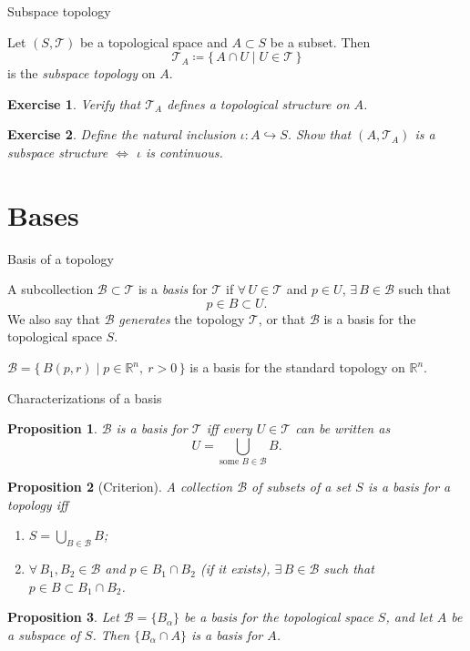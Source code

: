 \documentclass[10pt]{beamer}
\newtheorem{proposition}{Proposition}
\newtheorem{exercise}{Exercise}
\newcommand{\R}{\mathbb{R}}
\newcommand{\T}{\mathcal{T}}
\newcommand{\B}{\mathcal{B}}
\begin{document}
\begin{frame}{Subspace topology}
	\begin{definition}
		Let $(S,\T)$ be a topological space and $A \subset S$ be a subset. Then
		\[
			\T_A \coloneqq \{\, A \cap U \mid U \in \T \,\}
		\]
		is the \emph{subspace topology} on $A$.
	\end{definition}
	\begin{exercise}
		Verify that $\T_A$ defines a topological structure on $A$.
	\end{exercise}
	\begin{exercise}
		Define the natural inclusion $\iota: A \hookrightarrow S$. Show that
		$(A,\T_A)$ is a subspace structure $\iff$ $\iota$ is continuous.
	\end{exercise}
\end{frame}

\section{Bases}

\begin{frame}{Basis of a topology}
	\begin{definition}
		A subcollection $\B \subset \T$ is a \emph{basis} for $\T$ if
		$\forall\, U \in \T$ and $p \in U$, $\exists\, B \in \B$ such that
		\[
			p \in B \subset U.
		\]
		We also say that $\B$ \emph{generates} the topology $\T$, or that $\B$ is
		a basis for the topological space $S$.
	\end{definition}
	\begin{example}
		$\B = \{\, B(p,r) \mid p \in \R^n,\ r > 0 \,\}$ is a basis for the
		standard topology on $\R^n$.
	\end{example}
\end{frame}

\begin{frame}{Characterizations of a basis}
	\begin{proposition}
		$\B$ is a basis for $\T$ iff every $U \in \T$ can be written as
		\[
			U = \bigcup_{\text{some } B \in \B} B.
		\]
	\end{proposition}
	\begin{proposition}[Criterion]
		A collection $\B$ of subsets of a set $S$ is a basis for a topology iff
		\begin{enumerate}
			\item $S = \displaystyle\bigcup_{B \in \B} B$;
			\item $\forall\, B_1, B_2 \in \B$ and $p \in B_1 \cap B_2$
			      (if it exists), $\exists\, B \in \B$ such that
			      $p \in B \subset B_1 \cap B_2$.
		\end{enumerate}
	\end{proposition}
	\begin{proposition}
		Let $\B = \{B_\alpha\}$ be a basis for the topological space $S$, and let
		$A$ be a subspace of $S$. Then $\{B_\alpha \cap A\}$ is a basis for $A$.
	\end{proposition}
\end{frame}
\end{document}
